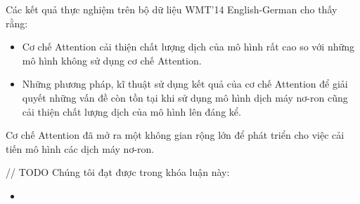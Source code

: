 Các kết quả thực nghiệm trên bộ dữ liệu WMT'14 English-German cho thấy rằng:
\begin{itemize}
	\item Cơ chế Attention cải thiện chất lượng dịch của mô hình rất cao so với những mô hình không sử dụng cơ chế Attention.
	\item Những phương pháp, kĩ thuật sử dụng kết quả của cơ chế Attention để giải quyết những vấn đề còn tồn tại khi sử dụng mô hình dịch máy nơ-ron cũng cải thiện chất lượng dịch của mô hình lên đáng kể.
\end{itemize}

Cơ chế Attention đã mở ra một không gian rộng lớn để phát triển cho việc cải tiến mô hình các dịch máy nơ-ron.

// TODO Chúng tôi đạt được trong khóa luận này:
\begin{itemize}
	\item 
\end{itemize}



